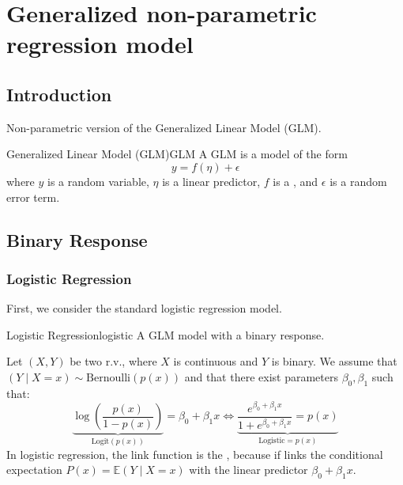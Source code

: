 \chapter{Generalized non-parametric regression model}

\section{Introduction}
Non-parametric version of the Generalized Linear Model (GLM).

\begin{definition}{Generalized Linear Model (GLM)}{GLM}
A GLM is a model of the form
\begin{equation}
y = f(\eta) + \epsilon
\end{equation}
where $y$ is a random variable, $\eta$ is a linear predictor, $f$ is a ,
and $\epsilon$ is a random error term.
\end{definition}

\pagebreak
\section{Binary Response}

\subsection{Logistic Regression}
First, we consider the standard logistic regression model.

\begin{definition}{Logistic Regression}{logistic}
    A GLM model with a binary response.

    Let $(X, Y)$ be two r.v., where $X$ is continuous and $Y$ is binary. We
    assume that $(Y \mid X = x) \sim \text{Bernoulli}(p(x))$ and that
    there exist parameters $\beta_0, \beta_1$ such that:
    \begin{equation*}
        \underbrace{\log\left(\frac{p(x)}{1 - p(x)}\right)}_{\text{Logit}(p(x))}
        = \beta_0 + \beta_1 x \iff
        \underbrace{\frac{e^{\beta_0 + \beta_1 x}}{1 + e^{\beta_0 + \beta_1 x}} = p(x)}_{\text{Logistic} = p(x)}
    \end{equation*}
    \tcblower
    In logistic regression, the link function is the , because
    if links the conditional expectation $P(x) = \mathds{E}(Y \mid X = x)$
    with the linear predictor $\beta_0 + \beta_1 x$.
\end{definition}

